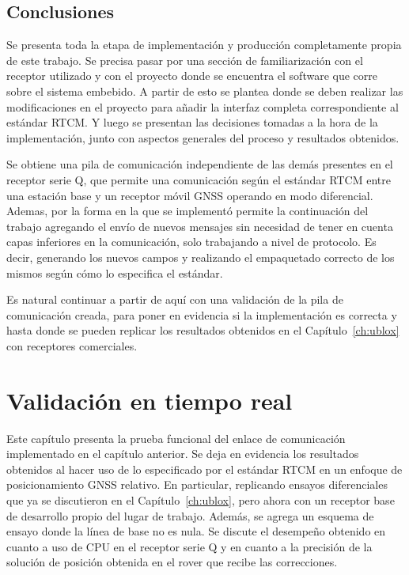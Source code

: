 \documentclass[a4paper,12pt,oneside,onecolumn,final,openright]{book}%
\begin{document}
\section{Conclusiones}
	Se presenta toda la etapa de implementación y producción completamente propia de este trabajo. Se precisa pasar por una sección de familiarización con el receptor utilizado y con el proyecto donde se encuentra el software que corre sobre el sistema embebido. A partir de esto se plantea donde se deben realizar las modificaciones en el proyecto para añadir la interfaz completa correspondiente al estándar RTCM. Y luego se presentan las decisiones tomadas a la hora de la implementación, junto con aspectos generales del proceso y resultados obtenidos. 
	
	Se obtiene una pila de comunicación independiente de las demás presentes en el receptor serie Q, que permite una comunicación según el estándar RTCM entre una estación base y un receptor móvil GNSS operando en modo diferencial. Ademas, por la forma en la que se implementó permite la continuación del trabajo agregando el envío de nuevos mensajes sin necesidad de tener en cuenta capas inferiores en la comunicación, solo trabajando a nivel de protocolo. Es decir, generando los nuevos campos y realizando el empaquetado correcto de los mismos según cómo lo especifica el estándar.
	
	Es natural continuar a partir de aquí con una validación de la pila de comunicación creada, para poner en evidencia si la implementación es correcta y hasta donde se pueden replicar los resultados obtenidos en el Capítulo~\ref{ch:ublox} con receptores comerciales.
\chapter{Validación en tiempo real}\label{ch:validacion}
	Este capítulo presenta la prueba funcional del enlace de comunicación implementado en el capítulo anterior. Se deja en evidencia los resultados obtenidos al hacer uso de lo especificado por el estándar RTCM en un enfoque de posicionamiento GNSS relativo. En particular, replicando ensayos diferenciales que ya se discutieron en el Capítulo~\ref{ch:ublox}, pero ahora con un receptor base de desarrollo propio del lugar de trabajo. Además, se agrega un esquema de ensayo donde la línea de base no es nula. Se discute el desempeño obtenido en cuanto a uso de CPU en el receptor serie Q y en cuanto a la precisión de la solución de posición obtenida en el rover que recibe las correcciones.
\end{document}
